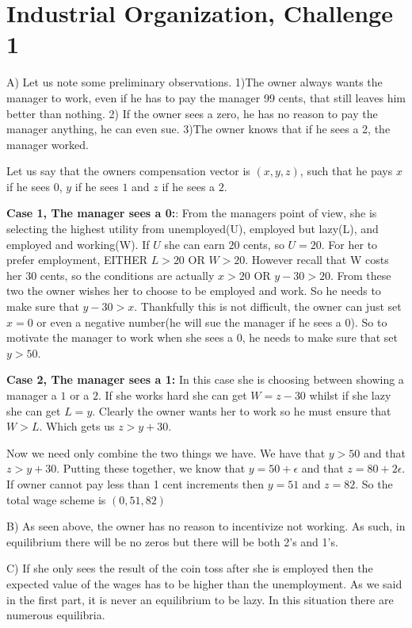 \documentclass[12pt]{report}
\numberwithin{equation}{section}
\begin{document}
\section{Industrial Organization, Challenge 1}

A) Let us note some preliminary observations. 1)The owner always wants the manager to work, even if he has to pay the manager 99 cents, that still leaves him better than nothing. 
2) If the owner sees a zero, he has no reason to pay the manager anything, he can even sue. 3)The owner knows that if he sees a 2, the manager worked. 

Let us say that the owners compensation vector is $(x,y,z)$, such that he pays $x$ if he sees $0$, $y$ if he sees $1$ and $z$ if he sees a $2$. 

\textbf{Case 1, The manager sees a 0:}: From the managers point of view, she is selecting the highest utility from unemployed(U), employed but lazy(L), and employed and working(W). If $U$ she can earn $20$ cents, so $U=20$. For her to prefer employment, EITHER $L>20$ OR $W>20$. However recall that W costs her $30$ cents,  so the conditions are actually $x>20$ OR $y-30>20$. From these two the owner wishes her to choose to be employed and work. So he needs to make sure that $y-30>x$. Thankfully this is not difficult, the owner can just set $x=0$ or even a negative number(he will sue the manager if he sees a $0$). So to motivate the manager to work when she sees a $0$, he needs to make sure that set $y > 50$. 

\textbf{Case 2, The manager sees a 1:} In this case she is choosing between showing a manager a $1$ or a $2$. If she works hard she can get $W=z-30$ whilst if she lazy she can get $L=y$. Clearly the owner wants her to work so he must ensure that $W>L$. Which gets us $z>y+30$. 

Now we need only combine the two things we have. We have that $y>50$ and that $z>y+30$. Putting these together, we know that $y=50+\epsilon$ and that $z=80+2\epsilon$. If owner cannot pay less than 1 cent increments then $y=51$ and $z=82$. So the total wage scheme is $(0,51,82)$

B) As seen above, the owner has no reason to incentivize not working. As such, in equilibrium there will be no zeros but there will be both 2's and 1's. 

\newpage
C) If she only sees the result of the coin toss after she is employed then the expected value of the wages has to be higher than the unemployment. As we said in the first part, it is never an equilibrium to be lazy. In this situation there are numerous equilibria. 
\end{document}
